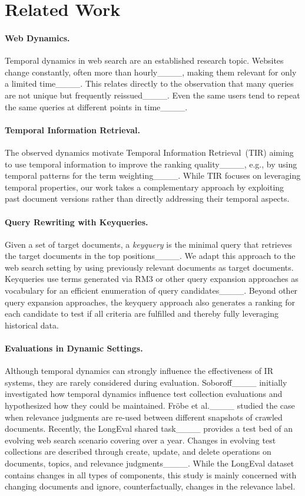 \section{Related Work}
\label{sec:related-work}

\paragraph{Web Dynamics.} Temporal dynamics in web search are an established research topic. Websites change constantly, often more than hourly____, making them relevant for only a limited time____. This relates directly to the observation that many queries are not unique but frequently reissued____. Even the same users tend to repeat the same queries at different points in time____.

\paragraph{Temporal Information Retrieval.} The observed dynamics motivate Temporal Information Retrieval~(TIR) aiming to use temporal information to improve the ranking quality____, e.g., by using temporal patterns for the term weighting____. While TIR focuses on leveraging temporal properties, our work takes a complementary approach by exploiting past document versions rather than directly addressing their temporal aspects.

\paragraph{Query Rewriting with Keyqueries.} Given a set of target documents, a \emph{keyquery} is the minimal query that retrieves the target documents in the top positions____. We adapt this approach to the web search setting by using previously relevant documents as target documents. Keyqueries use terms generated via RM3 or other query expansion approaches as vocabulary for an efficient enumeration of query candidates____. Beyond other query expansion approaches, the keyquery approach also generates a ranking for each candidate to test if all criteria are fulfilled and thereby fully leveraging historical data. 

\paragraph{Evaluations in Dynamic Settings.} Although temporal dynamics can strongly influence the effectiveness of IR systems, they are rarely  considered during evaluation. Soboroff____ initially investigated how temporal dynamics influence test collection evaluations and hypothesized how they could be maintained. Fr{\"o}be et al.____ studied the case when relevance judgments are re-used between different snapshots of crawled documents. Recently, the LongEval shared task____ provides a test bed of an evolving web search scenario covering over a year. Changes in evolving test collections are described through create, update, and delete operations on documents, topics, and relevance judgments____. While the LongEval dataset contains changes in all types of components, this study is mainly concerned with changing documents and ignore, counterfactually, changes in the relevance label.
